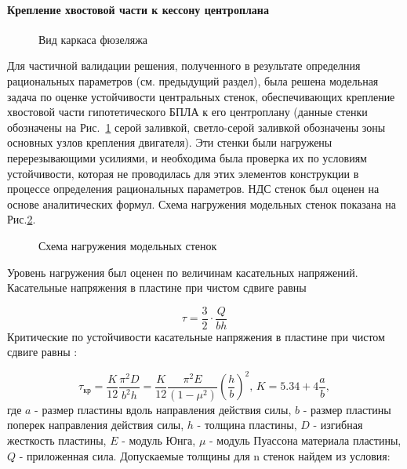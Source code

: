  \paragraph{Крепление хвостовой части к кессону центроплана} 
\label{sec:pants}
\begin{figure}[H]
\centering
\def\svgwidth{\textwidth}

\caption{Вид каркаса фюзеляжа}
\label{fig:IsoviewOfPants}
\end{figure}


Для частичной валидации решения, полученного в результате определния рациональных параметров (см. предыдущий раздел), была решена модельная задача по оценке устойчивости центральных стенок, обеспечивающих крепление хвостовой части гипотетического БПЛА к его центроплану (данные стенки обозначены на Рис.~\ref{fig:IsoviewOfPants} серой заливкой, светло-серой заливкой обозначены зоны основных узлов крепления двигателя). Эти стенки были нагружены перерезывающими усилиями, и необходима была проверка их по условиям устойчивости, которая не проводилась для этих элементов конструкции в процессе определения рациональных параметров. НДС стенок был оценен на основе аналитических формул. Схема нагружения модельных стенок показана на Рис.\ref{fig:IsoviewOfPantsModel}.

\begin{figure}[H]
\centering

\caption{Схема нагружения модельных стенок}
\label{fig:IsoviewOfPantsModel}
\end{figure}

%


Уровень нагружения был оценен по величинам касательных напряжений. Касательные напряжения в пластине при чистом сдвиге равны

\begin{equation}
\tau=\frac{3}{2}\cdot\frac{Q}{bh}
\end{equation}
Критические по устойчивости касательные напряжения в пластине при чистом сдвиге равны \cite{Volmir}:

\begin{equation}
\tau_\text{кр}=\frac{K}{12}\frac{\pi^2D}{b^2h} = \frac{K}{12}\frac{\pi^2E}{(1-\mu^2)}\left(\frac{h}{b}\right)^2,\, K=5.34 + 4\frac{a}{b},
\end{equation}
где $a$ - размер пластины вдоль направления действия силы, $b$ - размер пластины поперек направления действия силы, $h$ - толщина пластины, $D$ - изгибная жесткость пластины, $E$ - модуль Юнга, $\mu$ - модуль Пуассона материала пластины, $Q$ - приложенная сила.
Допускаемые толщины для n стенок найдем из условия:

